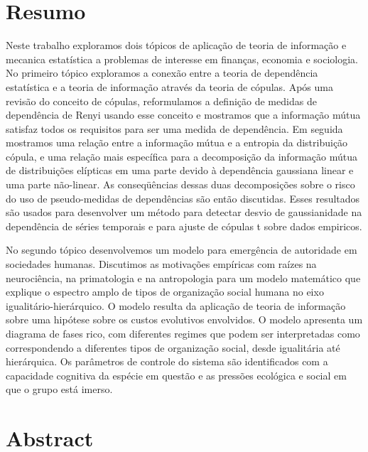 \chapter*{Resumo}
Neste trabalho exploramos dois tópicos de aplicação de teoria de informação e mecanica estatística a problemas de interesse em finanças, economia e sociologia. No primeiro tópico exploramos a conexão entre a teoria de dependência estatística e a teoria de informação através da teoria de cópulas. Após uma revisão do conceito de cópulas, reformulamos a definição de medidas de dependência de Renyi\cite{Renyi1959} usando esse conceito e mostramos que a informação mútua satisfaz todos os requisitos para ser uma medida de dependência. Em seguida mostramos uma relação entre a informação mútua e a entropia da distribuição cópula, e uma relação mais específica para a decomposição da informação mútua de distribuições elípticas em uma parte devido à dependência gaussiana linear e uma parte não-linear. As conseqüências dessas duas decomposições sobre o risco do uso de pseudo-medidas de dependências são então discutidas. Esses resultados são usados para desenvolver um método para detectar desvio de gaussianidade na dependência de séries temporais e para ajuste de cópulas t sobre dados empiricos\cite{Calsaverini2009}.

No segundo tópico desenvolvemos um modelo para emergência de autoridade em sociedades humanas. Discutimos as motivações empíricas com raízes na neurociência, na primatologia e na antropologia para um modelo matemático que explique o espectro amplo de tipos de organização social humana no eixo igualitário-hierárquico. O modelo resulta da aplicação de teoria de informação sobre uma hipótese sobre os custos evolutivos envolvidos. O modelo apresenta um diagrama de fases rico, com diferentes regimes que podem ser interpretadas como correspondendo a diferentes tipos de organização social, desde igualitária até hierárquica. Os parâmetros de controle do sistema são identificados com a capacidade cognitiva da espécie em questão e as pressões ecológica e social em que o grupo está imerso.

\chapter*{Abstract}
 
